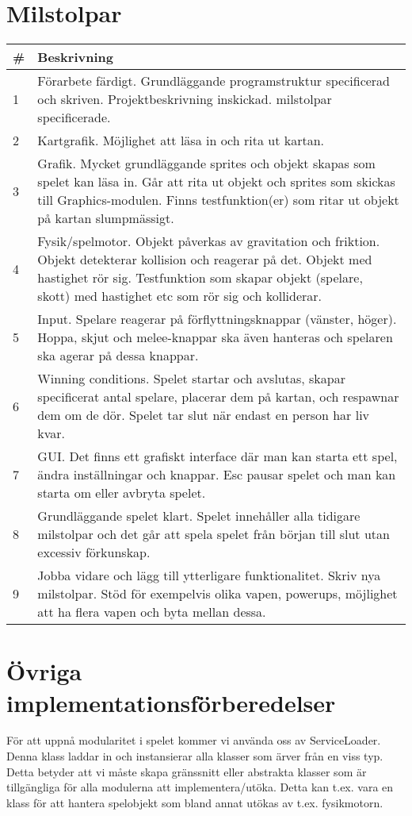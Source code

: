 \section{Milstolpar}
\begin{tabular}{| l | p{11cm} |}
    \hline
    \# & Beskrivning \\ \hline
    1 & Förarbete färdigt. Grundläggande programstruktur specificerad och skriven. Projektbeskrivning inskickad. milstolpar specificerade. \\ \hline
    2 & Kartgrafik. Möjlighet att läsa in och rita ut kartan. \\ \hline
    3 & Grafik. Mycket grundläggande sprites och objekt skapas som spelet kan läsa in. Går att rita ut objekt och sprites som skickas till Graphics-modulen. Finns testfunktion(er) som ritar ut objekt på kartan slumpmässigt. \\ \hline
    4 & Fysik/spelmotor. Objekt påverkas av gravitation och friktion. Objekt detekterar kollision och reagerar på det. Objekt med hastighet rör sig. Testfunktion som skapar objekt (spelare, skott) med hastighet etc som rör sig och kolliderar. \\ \hline
    5 & Input. Spelare reagerar på förflyttningsknappar (vänster, höger). Hoppa, skjut och melee-knappar ska även hanteras och spelaren ska agerar på dessa knappar. \\ \hline
    6 & Winning conditions. Spelet startar och avslutas, skapar specificerat antal spelare, placerar dem på kartan, och respawnar dem om de dör. Spelet tar slut när endast en person har liv kvar. \\ \hline
    7 & GUI. Det finns ett grafiskt interface där man kan starta ett spel, ändra inställningar och knappar. Esc pausar spelet och man kan starta om eller avbryta spelet. \\ \hline
    8 & Grundläggande spelet klart. Spelet innehåller alla tidigare milstolpar och det går att spela spelet från början till slut utan excessiv förkunskap. \\ \hline
    9 & Jobba vidare och lägg till ytterligare funktionalitet. Skriv nya milstolpar. Stöd för exempelvis olika vapen, powerups, möjlighet att ha flera vapen och byta mellan dessa. \\ \hline
\end{tabular}
\section{Övriga implementationsförberedelser}
För att uppnå modularitet i spelet kommer vi använda oss av ServiceLoader. Denna klass laddar in och instansierar alla klasser som ärver från en viss typ. Detta betyder att vi måste skapa gränssnitt eller abstrakta klasser som är tillgängliga för alla modulerna att implementera/utöka. Detta kan t.ex. vara en klass för att hantera spelobjekt som bland annat utökas av t.ex. fysikmotorn.
